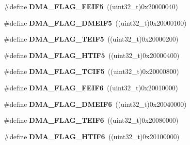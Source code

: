 \begin{DoxyCompactItemize}
\#define {\bfseries D\+M\+A\+\_\+\+F\+L\+A\+G\+\_\+\+F\+E\+I\+F5}~((uint32\+\_\+t)0x20000040)
\item 
\mbox{\label{group___d_m_a__flags__definition_ga70a0d9684bfd6e6ef2cce31fc8e33512}} 
\#define {\bfseries D\+M\+A\+\_\+\+F\+L\+A\+G\+\_\+\+D\+M\+E\+I\+F5}~((uint32\+\_\+t)0x20000100)
\item 
\mbox{\label{group___d_m_a__flags__definition_ga64ee170cb2d0fbe5daa6d3166c65190d}} 
\#define {\bfseries D\+M\+A\+\_\+\+F\+L\+A\+G\+\_\+\+T\+E\+I\+F5}~((uint32\+\_\+t)0x20000200)
\item 
\mbox{\label{group___d_m_a__flags__definition_ga005ff333f9f114f5966f35b90df0ff9a}} 
\#define {\bfseries D\+M\+A\+\_\+\+F\+L\+A\+G\+\_\+\+H\+T\+I\+F5}~((uint32\+\_\+t)0x20000400)
\item 
\mbox{\label{group___d_m_a__flags__definition_ga50cb345a0bb8bde37228b0a1d5becc4c}} 
\#define {\bfseries D\+M\+A\+\_\+\+F\+L\+A\+G\+\_\+\+T\+C\+I\+F5}~((uint32\+\_\+t)0x20000800)
\item 
\mbox{\label{group___d_m_a__flags__definition_gafc0383aab975f70507f76e983c32b8c0}} 
\#define {\bfseries D\+M\+A\+\_\+\+F\+L\+A\+G\+\_\+\+F\+E\+I\+F6}~((uint32\+\_\+t)0x20010000)
\item 
\mbox{\label{group___d_m_a__flags__definition_ga1d85ff6756ffbd8284ac435f3781eb4a}} 
\#define {\bfseries D\+M\+A\+\_\+\+F\+L\+A\+G\+\_\+\+D\+M\+E\+I\+F6}~((uint32\+\_\+t)0x20040000)
\item 
\mbox{\label{group___d_m_a__flags__definition_ga2900d2ad700dffbb058b238162018be0}} 
\#define {\bfseries D\+M\+A\+\_\+\+F\+L\+A\+G\+\_\+\+T\+E\+I\+F6}~((uint32\+\_\+t)0x20080000)
\item 
\mbox{\label{group___d_m_a__flags__definition_gaa2e5cb8680883513cf8fccef6c39c78e}} 
\#define {\bfseries D\+M\+A\+\_\+\+F\+L\+A\+G\+\_\+\+H\+T\+I\+F6}~((uint32\+\_\+t)0x20100000)
\item 
\mbox{\label{group___d_m_a__flags__definition_ga7b16e37ffcf292fcab6745af7de1e50c}} 

\end{DoxyCompactItemize}
